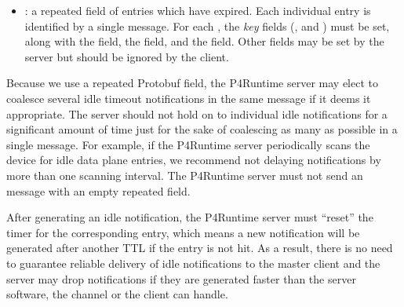 \documentclass[11pt]{article}
\begin{document}
{\begin{itemize}
\item{}
: a repeated field of entries which have expired. Each individual
entry is identified by a single  message. For each ,
the \emph{key} fields (,  and ) must be set, along with
the  field, the  field, and the
 field. Other fields may be set by the server but should be
ignored by the client.%
\end{itemize}%

\noindent{}Because we use a repeated Protobuf field, the P4Runtime server may elect to
coalesce several idle timeout notifications in the same
 message if it deems it appropriate. The server should
not hold on to individual idle notifications for a significant amount of time
just for the sake of coalescing as many as possible in a single message. For
example, if the P4Runtime server periodically scans the device for idle data
plane entries, we recommend not delaying notifications by more than one scanning
interval. The P4Runtime server must not send an 
message with an empty  repeated field.%

After generating an idle notification, the P4Runtime server must \textquotedblleft{}reset\textquotedblright{} the
timer for the corresponding entry, which means a new notification will be
generated after another TTL if the entry is not hit. As a result, there is no
need to guarantee reliable delivery of idle notifications to the master client
and the server may drop notifications if they are generated faster than the
server software, the channel or the client can handle.%

}
\end{document}
